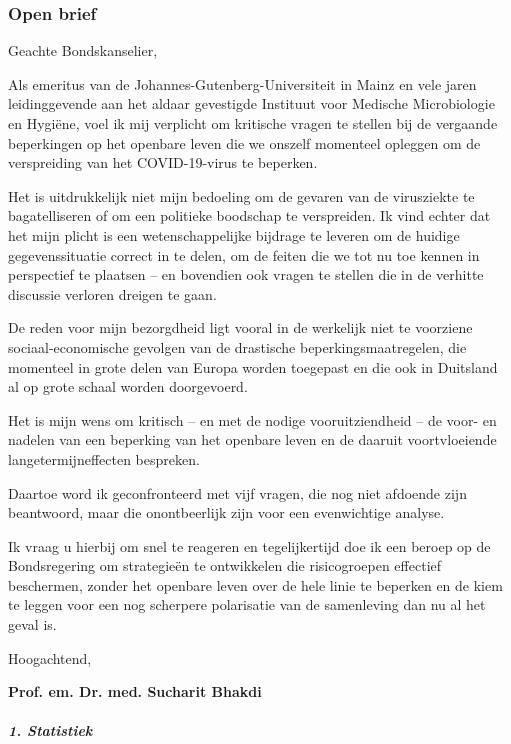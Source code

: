 \hypertarget{open-brief}{%
\subsubsection{\texorpdfstring{\textbf{Open
brief}}{Open brief}}\label{open-brief}}

Geachte Bondskanselier,

Als emeritus van de Johannes-Gutenberg-Universiteit in Mainz en vele
jaren leidinggevende aan het aldaar gevestigde Instituut voor Medische
Microbiologie en Hygiëne, voel ik mij verplicht om kritische vragen te
stellen bij de vergaande beperkingen op het openbare leven die we
onszelf momenteel opleggen om de verspreiding van het COVID-19-virus te
beperken.

Het is uitdrukkelijk niet mijn bedoeling om de gevaren van de
virusziekte te bagatelliseren of om een politieke boodschap te
verspreiden. Ik vind echter dat het mijn plicht is een wetenschappelijke
bijdrage te leveren om de huidige gegevenssituatie correct in te delen,
om de feiten die we tot nu toe kennen in perspectief te plaatsen -- en
bovendien ook vragen te stellen die in de verhitte discussie verloren
dreigen te gaan.

De reden voor mijn bezorgdheid ligt vooral in de werkelijk niet te
voorziene sociaal-economische gevolgen van de drastische
beperkingsmaatregelen, die momenteel in grote delen van Europa worden
toegepast en die ook in Duitsland al op grote schaal worden doorgevoerd.

Het is mijn wens om kritisch -- en met de nodige vooruitziendheid -- de
voor- en nadelen van een beperking van het openbare leven en de daaruit
voortvloeiende langetermijneffecten bespreken.

Daartoe word ik geconfronteerd met vijf vragen, die nog niet afdoende
zijn beantwoord, maar die onontbeerlijk zijn voor een evenwichtige
analyse.

Ik vraag u hierbij om snel te reageren en tegelijkertijd doe ik een
beroep op de Bondsregering om strategieën te ontwikkelen die
risicogroepen effectief beschermen, zonder het openbare leven over de
hele linie te beperken en de kiem te leggen voor een nog scherpere
polarisatie van de samenleving dan nu al het geval is.

Hoogachtend,

\textbf{Prof. em. Dr. med. Sucharit Bhakdi}\\

\hypertarget{1-statistiek}{%
\subparagraph{\texorpdfstring{\textbf{1.
Statistiek}}{1. Statistiek}}\label{1-statistiek}}

